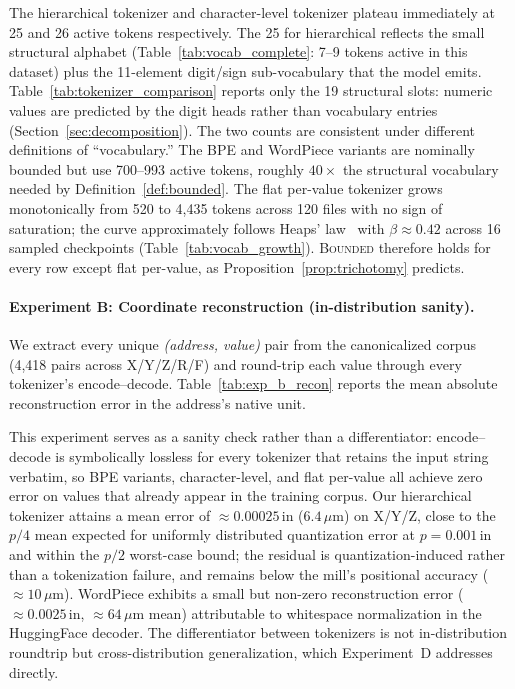 \documentclass[sensors,article,submit,moreauthors,pdftex]{Definitions/mdpi}
\begin{document}
The hierarchical tokenizer and character-level tokenizer plateau immediately at 25 and 26 active tokens respectively. The 25 for hierarchical reflects the small structural alphabet (Table~\ref{tab:vocab_complete}: 7--9 tokens active in this dataset) plus the 11-element digit/sign sub-vocabulary that the model emits. Table~\ref{tab:tokenizer_comparison} reports only the 19 structural slots: numeric values are predicted by the digit heads rather than vocabulary entries (Section~\ref{sec:decomposition}). The two counts are consistent under different definitions of ``vocabulary.'' The BPE and WordPiece variants are nominally bounded but use 700--993 active tokens, roughly $40\times$ the structural vocabulary needed by Definition~\ref{def:bounded}. The flat per-value tokenizer grows monotonically from 520 to 4{,}435 tokens across 120 files with no sign of saturation; the curve approximately follows Heaps' law~\cite{heaps1978} with $\beta \approx 0.42$ across 16 sampled checkpoints (Table~\ref{tab:vocab_growth}). \textsc{Bounded} therefore holds for every row except flat per-value, as Proposition~\ref{prop:trichotomy} predicts.

\paragraph{Experiment B: Coordinate reconstruction (in-distribution sanity).}
We extract every unique \emph{(address, value)} pair from the canonicalized corpus (4{,}418 pairs across X/Y/Z/R/F) and round-trip each value through every tokenizer's encode--decode. Table~\ref{tab:exp_b_recon} reports the mean absolute reconstruction error in the address's native unit.



This experiment serves as a sanity check rather than a differentiator: encode--decode is symbolically lossless for every tokenizer that retains the input string verbatim, so BPE variants, character-level, and flat per-value all achieve zero error on values that already appear in the training corpus. Our hierarchical tokenizer attains a mean error of $\approx\!0.00025\,$in ($6.4\,\mu$m) on X/Y/Z, close to the $p/4$ mean expected for uniformly distributed quantization error at $p = 0.001\,$in and within the $p/2$ worst-case bound; the residual is quantization-induced rather than a tokenization failure, and remains below the mill's positional accuracy ($\approx\!10\,\mu$m). WordPiece exhibits a small but non-zero reconstruction error ($\approx\!0.0025\,$in, $\approx\!64\,\mu$m mean) attributable to whitespace normalization in the HuggingFace decoder. The differentiator between tokenizers is not in-distribution roundtrip but cross-distribution generalization, which Experiment~D addresses directly.
\end{document}
